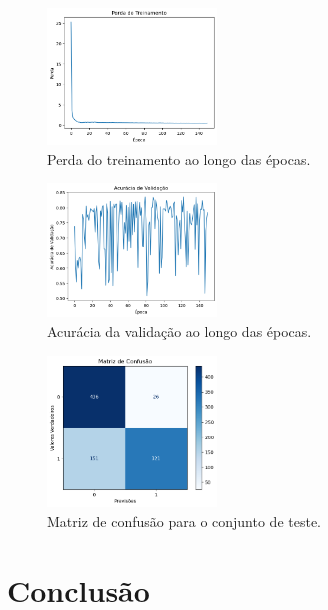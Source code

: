 \documentclass[conference]{IEEEtran}
\begin{document}
\begin{figure}[htbp]

    \centerline{\includegraphics[width=0.4\textwidth]{images/training-loss.png}}
    \caption{Perda do treinamento ao longo das épocas.}
    \label{fig:training-loss}
\end{figure}

\begin{figure}[htbp]

    \centerline{\includegraphics[width=0.4\textwidth]{images/validation-accuracy.png}}
    \caption{Acurácia da validação ao longo das épocas.}
    \label{fig:validation-accuracy}
\end{figure}

\begin{figure}[htbp]

    \centerline{\includegraphics[width=0.4\textwidth]{images/matriz-confusao.png}}
    \caption{Matriz de confusão para o conjunto de teste.}
    \label{fig:confusion-matrix}
\end{figure}
\section{Conclusão}
\end{document}
